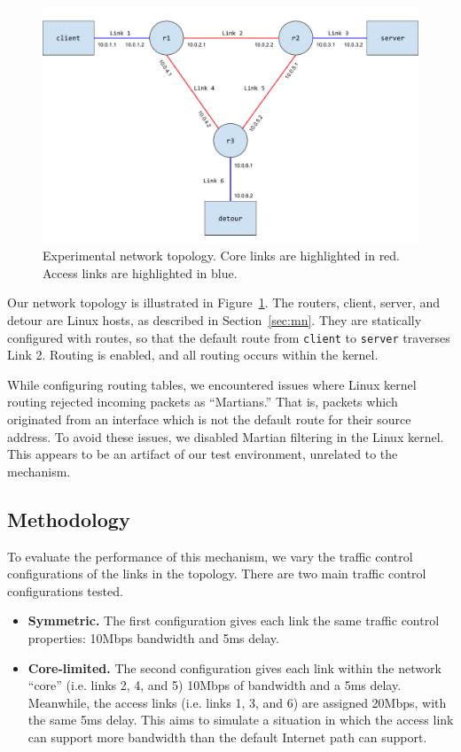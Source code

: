 \documentclass{cwru}
\begin{document}
\begin{figure}
  \centering
  \includegraphics[width=\textwidth]{figures/Topology.pdf}
  \caption[Experimental network topology]{Experimental network topology. Core
    links are highlighted in red. Access links are highlighted in blue.}
  \label{fig:topo}
\end{figure}

Our network topology is illustrated in Figure~\ref{fig:topo}. The routers,
client, server, and detour are Linux hosts, as described in
Section~\ref{sec:mn}. They are statically configured with routes, so that the
default route from \texttt{client} to \texttt{server} traverses Link 2. Routing
is enabled, and all routing occurs within the kernel.

While configuring routing tables, we encountered issues where Linux kernel
routing rejected incoming packets as ``Martians.'' That is, packets which
originated from an interface which is not the default route for their source
address. To avoid these issues, we disabled Martian filtering in the Linux
kernel. This appears to be an artifact of our test environment, unrelated to the
mechanism.

\subsection{Methodology}

To evaluate the performance of this mechanism, we vary the traffic control
configurations of the links in the topology. There are two main traffic control
configurations tested.

\begin{itemize}
\item \textbf{Symmetric.} The first configuration gives each link the same
  traffic control properties: 10Mbps bandwidth and 5ms delay.
\item \textbf{Core-limited.} The second configuration gives each link within the
  network ``core'' (i.e. links 2, 4, and 5) 10Mbps of bandwidth and a 5ms delay.
  Meanwhile, the access links (i.e. links 1, 3, and 6) are assigned 20Mbps, with
  the same 5ms delay. This aims to simulate a situation in which the access link
  can support more bandwidth than the default Internet path can support.
\end{itemize}
\end{document}
